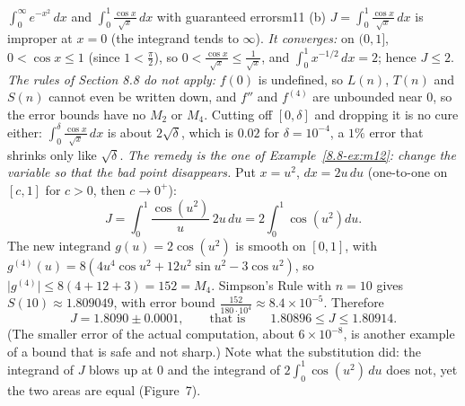 \documentclass[11pt]{article}
\begin{document}
\begin{exmp}{$\displaystyle\int_0^\infty e^{-x^2}\,dx$ and $\displaystyle\int_0^1\frac{\cos x}{\sqrt x}\,dx$ with guaranteed errors}{m11}
(b) $J=\int_0^1\frac{\cos x}{\sqrt x}\,dx$ is improper at $x=0$ (the integrand tends to $\infty$). \emph{It converges:} on $(0,1]$, $0<\cos x\le1$ (since $1<\frac\pi2$), so $0<\frac{\cos x}{\sqrt x}\le\frac1{\sqrt x}$, and $\int_0^1x^{-1/2}\,dx=2$; hence $J\le2$. \emph{The rules of Section 8.8 do not apply:} $f(0)$ is undefined, so $L(n)$, $T(n)$ and $S(n)$ cannot even be written down, and $f''$ and $f^{(4)}$ are unbounded near $0$, so the error bounds have no $M_2$ or $M_4$. Cutting off $[0,\delta]$ and dropping it is no cure either: $\int_0^\delta\frac{\cos x}{\sqrt x}\,dx$ is about $2\sqrt\delta$, which is $0.02$ for $\delta=10^{-4}$, a $1\%$ error that shrinks only like $\sqrt\delta$.
\emph{The remedy is the one of Example~\ref{8.8-ex:m12}: change the variable so that the bad point disappears.} Put $x=u^2$, $dx=2u\,du$ (one-to-one on $[c,1]$ for $c>0$, then $c\to0^+$):
\[J=\int_0^1\frac{\cos\left(u^2\right)}u\,2u\,du=2\int_0^1\cos\left(u^2\right)du .\]
The new integrand $g(u)=2\cos\left(u^2\right)$ is smooth on $[0,1]$, with $g^{(4)}(u)=8\left(4u^4\cos u^2+12u^2\sin u^2-3\cos u^2\right)$, so $\lvert g^{(4)}\rvert\le8(4+12+3)=152=M_4$. Simpson's Rule with $n=10$ gives $S(10)\approx1.809049$, with error bound $\frac{152}{180\cdot10^4}\approx8.4\times10^{-5}$. Therefore
\[J=1.8090\pm0.0001,\qquad\text{that is}\qquad1.80896\le J\le1.80914 .\]
(The smaller error of the actual computation, about $6\times10^{-8}$, is another example of a bound that is safe and not sharp.) Note what the substitution did: the integrand of $J$ blows up at $0$ and the integrand of $2\int_0^1\cos(u^2)\,du$ does not, yet the two areas are equal (Figure~7).


\end{exmp}
\end{document}
